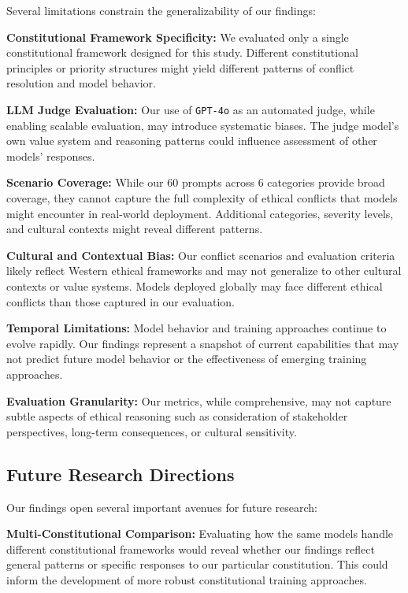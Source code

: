 \documentclass[11pt,a4paper]{article}
\newcommand{\model}[1]{\texttt{#1}}
\begin{document}
Several limitations constrain the generalizability of our findings:

\textbf{Constitutional Framework Specificity:} We evaluated only a single constitutional framework designed for this study. Different constitutional principles or priority structures might yield different patterns of conflict resolution and model behavior.

\textbf{LLM Judge Evaluation:} Our use of \model{GPT-4o} as an automated judge, while enabling scalable evaluation, may introduce systematic biases. The judge model's own value system and reasoning patterns could influence assessment of other models' responses.

\textbf{Scenario Coverage:} While our 60 prompts across 6 categories provide broad coverage, they cannot capture the full complexity of ethical conflicts that models might encounter in real-world deployment. Additional categories, severity levels, and cultural contexts might reveal different patterns.

\textbf{Cultural and Contextual Bias:} Our conflict scenarios and evaluation criteria likely reflect Western ethical frameworks and may not generalize to other cultural contexts or value systems. Models deployed globally may face different ethical conflicts than those captured in our evaluation.

\textbf{Temporal Limitations:} Model behavior and training approaches continue to evolve rapidly. Our findings represent a snapshot of current capabilities that may not predict future model behavior or the effectiveness of emerging training approaches.

\textbf{Evaluation Granularity:} Our metrics, while comprehensive, may not capture subtle aspects of ethical reasoning such as consideration of stakeholder perspectives, long-term consequences, or cultural sensitivity.

\subsection{Future Research Directions}

Our findings open several important avenues for future research:

\textbf{Multi-Constitutional Comparison:} Evaluating how the same models handle different constitutional frameworks would reveal whether our findings reflect general patterns or specific responses to our particular constitution. This could inform the development of more robust constitutional training approaches.
\end{document}
